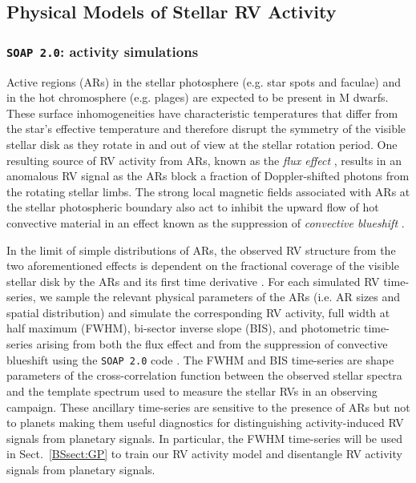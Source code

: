 \subsection{Physical Models of Stellar RV Activity} \label{BSsect:activity}
\subsubsection{\texttt{SOAP 2.0}: activity simulations} \label{BSsect:soap}
Active regions (ARs) in the stellar photosphere (e.g. star spots and faculae) and in
the hot chromosphere (e.g. plages) are expected to be present in M dwarfs. These surface inhomogeneities
have characteristic temperatures that differ from the star's effective temperature and therefore 
disrupt the symmetry of the visible stellar disk as they rotate in and out of view at the stellar rotation
period. One resulting source of RV activity from ARs, known as the \emph{flux effect} \citep{dumusque14},
results in an anomalous RV signal as the ARs block a fraction of Doppler-shifted
photons from the rotating stellar limbs. The strong local magnetic fields associated with ARs
at the stellar photospheric boundary also act to inhibit the upward flow of hot convective material
in an effect known as the suppression of \emph{convective blueshift} \citep{dravins81}.

In the limit of simple distributions of ARs, the observed RV structure from the two aforementioned effects 
is dependent on the fractional coverage of the visible stellar disk by the ARs and its first time
derivative \citep{aigrain12}. For each simulated RV time-series, we sample the relevant physical
parameters of the ARs (i.e. AR sizes and spatial distribution) and 
simulate the corresponding RV activity, full width at half maximum (FWHM), bi-sector inverse slope (BIS),
and photometric time-series arising from both the flux effect and from the suppression of convective blueshift 
using the \texttt{SOAP 2.0} code \citep{dumusque14}. The FWHM and BIS time-series are shape parameters of
the cross-correlation function between the observed stellar spectra and the template spectrum used to measure
the stellar RVs in an observing campaign. These ancillary time-series are sensitive to the presence of ARs but not to planets
making them useful diagnostics for distinguishing activity-induced RV signals from planetary signals.
In particular, the FWHM time-series will be used in
Sect.~\ref{BSsect:GP} to train our RV activity model and disentangle RV activity signals from planetary signals.

